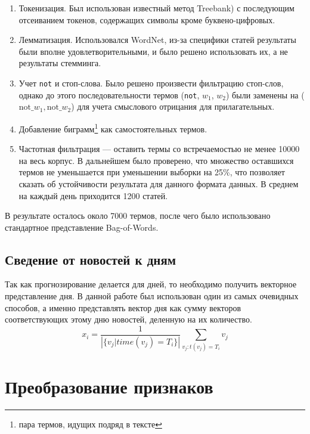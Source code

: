 \documentclass[pdftex,14pt,a4paper]{extreport}
\begin{document}
\begin{enumerate}

\item Токенизация. Был использован известный метод Treebank\cite{treebank}) с последующим отсеиванием токенов,
содержащих символы кроме буквено-цифровых.
\item Лемматизация. Использовался WordNet\cite{wordnet}, из-за специфики статей результаты были вполне удовлетворительными,
и было решено использовать их, а не результаты стемминга.
\item Учет \texttt{not} и стоп-слова. Было решено произвести фильтрацию стоп-слов, однако до этого последовательности
термов (\texttt{not}, $w_1$, $w_2$) были заменены на ($\text{not\_} w_1, \text{not\_} w_2$) для учета смыслового отрицания
для прилагательных.
\item Добавление биграмм\footnote{пара термов, идущих подряд в тексте} как самостоятельных термов.
\item Частотная фильтрация --- оставить термы со встречаемостью не менее 10000 на весь корпус. В дальнейшем было проверено,
что множество оставшихся термов не уменьшается при уменьшении выборки на 25\%, что позволяет сказать об устойчивости
результата для данного формата данных. В среднем на каждый день приходится 1200 статей.

\end{enumerate}

В результате осталось около 7000 термов, после чего было использовано стандартное представление Bag-of-Words.

\subsection{Сведение от новостей к дням}

Так как прогнозирование делается для дней, то необходимо получить векторное представление дня.
В данной работе был использован один из самых очевидных способов, а именно представлять вектор дня как сумму векторов соответствующих этому дню новостей, деленную на их количество.
\begin{equation}
x_i = \frac{1}{\left|\{v_j | time(v_j)=T_i\}\right|} \sum_{v_j: t(v_j)=T_i} v_j
\end{equation}

\section{Преобразование признаков}
\end{document}
